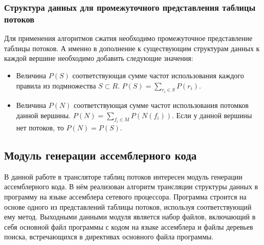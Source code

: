 \documentclass[oneside,final,12pt]{extarticle}
\begin{document}
            \subsubsection{Структура данных для промежуточного представления таблицы потоков}
                Для применения алгоритмов сжатия необходимо промежуточное представление таблицы потоков.
                А именно в дополнение к существующим структурам данных к каждой вершине необходимо добавить следующие значения:
                \begin{itemize}
                    \item Величина \(P(S)\) соответствующая сумме частот использования каждого правила из подмножества \(S \subset R\). 
                        \(P(S) = \sum_{r_i \in S} P(r_i)\).
                    \item Величина \(P(N)\) соответствующая сумме частот использования потомков данной вершины. \(P(N) = \sum_{f_i \in M} P(N(f_i))\).
                        Если у данной вершины нет потоков, то \(P(N) = P(S)\).
                \end{itemize}
        \subsection{Модуль генерации ассемблерного кода}
            В данной работе в трансляторе таблиц потоков интересен модуль генерации 
            ассемблерного кода. В нём реализован алгоритм трансляции структуры данных в программу 
            на языке ассемблера сетевого процессора. Программа строится на основе одного из 
            представлений таблицы потоков, используя соответствующий ему метод. Выходными данными 
            модуля является набор файлов, включающий в себя основной файл программы с кодом 
            на языке ассемблера и файлы деревьев поиска, встречающихся в директивах основного 
            файла программы.
\end{document}

